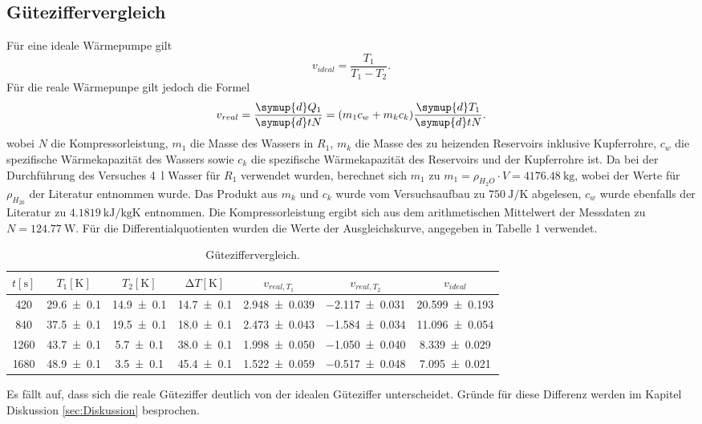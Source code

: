 \subsection{Güteziffervergleich}
Für eine ideale Wärmepumpe gilt
\begin{equation}
  v_{ideal} = \frac{T_1}{T_1-T_2}.
\end{equation}
Für die reale Wärmepunpe gilt jedoch die Formel
\begin{equation}
  v_{real}= \frac{\symup{d} Q_1}{\symup{d} tN} = (m_1c_w+m_kc_k)\frac{\symup{d} T_1}{\symup{d} tN}.
\end{equation}
wobei $ N$ die Kompressorleistung, $ m_1$ die Masse des Wassers in $ R_1 $, $m_k$ die Masse des zu heizenden Reservoirs inklusive Kupferrohre, $ c_w $ die spezifische Wärmekapazität des Wassers sowie $ c_k $ die spezifische Wärmekapazität des Reservoirs und der Kupferrohre ist.
Da bei der Durchführung des Versuches \SI{4}{\litre} Wasser für $R_1$ verwendet wurden, berechnet sich $m_1$ zu $m_1 = \rho_{H_2O} \cdot V = \SI{4176.48}{\kilogram}$, wobei der Werte für $\rho_{H_20}$ der Literatur entnommen wurde.
Das Produkt aus $m_k$ und $c_k$ wurde vom Versuchsaufbau zu $\SI{750}{\joule\per\kelvin}$ abgelesen, $c_w$ wurde ebenfalls der Literatur zu $\SI{4,1819}{\kilo\joule\per\kilogram\kelvin}$ entnommen.
Die Kompressorleistung ergibt sich aus dem arithmetischen Mittelwert der Messdaten zu $N=\SI{124.77}{\watt}$.
Für die Differentialquotienten wurden die Werte der Ausgleichskurve, angegeben in Tabelle 1 verwendet.

\begin{table}[H]
  \centering
  \caption{Güteziffervergleich.}
  \label{tab:tabelle2}
\begin{tabular}{c c c c c c c}
  \toprule
  {$t [\si{\second}]$} & {$T_1 [\si{\kelvin}]$} & {$T_2 [\si{\kelvin}]$} & {$\increment{T} [\si{\kelvin}]$} & {$v_{real, T_1}$}  & {$v_{real, T_2}$} & {$v_{ideal}$}\\
  \midrule
  \num{420} & \num{29.6 +- 0.1} & \num{14.9 +- 0.1} & \num{14.7 +- 0.1} & \num{2.948 +- 0.039} & \num{-2.117 +- 0.031} & \num{20.599 +- 0.193} \\
  \num{840} & \num{37.5 +- 0.1} & \num{19.5 +- 0.1} & \num{18.0 +- 0.1} & \num{2.473 +- 0.043} & \num{-1.584 +- 0.034} & \num{11.096 +- 0.054}  \\
  \num{1260} & \num{43.7 +- 0.1} & \num{5.7 +- 0.1} & \num{38.0 +- 0.1} & \num{1.998 +- 0.050} & \num{-1.050 +- 0.040} & \num{8.339 +- 0.029}  \\
  \num{1680} & \num{48.9 +- 0.1} & \num{3.5 +- 0.1} & \num{45.4 +- 0.1} & \num{1.522 +- 0.059} & \num{-0.517 +- 0.048} & \num{7.095 +- 0.021}  \\
  \bottomrule
\end{tabular}
\end{table}
Es fällt auf, dass sich die reale Güteziffer deutlich von der idealen Güteziffer unterscheidet.
Gründe für diese Differenz werden im Kapitel Diskussion \ref{sec:Diskussion} besprochen.
